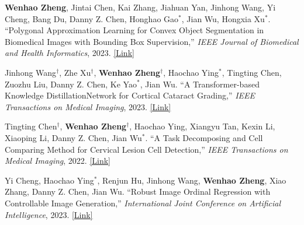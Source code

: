 \begin{cventries}
{\begin{cvitemize2}
            \item \textbf{Wenhao Zheng}, Jintai Chen, Kai Zhang, Jiahuan Yan, Jinhong Wang, Yi Cheng, Bang Du, Danny Z. Chen, Honghao Gao$^*$, Jian Wu, Hongxia Xu$^*$. ``Polygonal Approximation Learning for Convex Object Segmentation in Biomedical Images with Bounding Box Supervision,'' \textit{IEEE Journal of Biomedical and Health Informatics}, 2023. \href{https://ieeexplore.ieee.org/document/10354298}{\textcolor{link}{[Link]}}
            \vspace{1mm}
            \item Jinhong Wang$^\dagger$, Zhe Xu$^\dagger$, \textbf{Wenhao Zheng$^\dagger$}, Haochao Ying$^*$, Tingting Chen, Zuozhu Liu, Danny Z. Chen, Ke Yao$^*$, Jian Wu. ``A Transformer-based Knowledge DistillationNetwork for Cortical Cataract Grading,'' \textit{IEEE Transactions on Medical Imaging}, 2023. \href{https://ieeexplore.ieee.org/abstract/document/10294274}{\textcolor{link}{[Link]}}
            \vspace{1mm}
            \item Tingting Chen$^\dagger$, \textbf{Wenhao Zheng$^\dagger$}, Haochao Ying, Xiangyu Tan, Kexin Li, Xiaoping Li, Danny Z. Chen, Jian Wu$^*$. ``A Task Decomposing and Cell Comparing Method for Cervical Lesion Cell Detection,'' \textit{IEEE Transactions on Medical Imaging}, 2022. \href{https://ieeexplore.ieee.org/document/9744114}{\textcolor{link}{[Link]}}
            \vspace{1mm}
            \item Yi Cheng, Haochao Ying$^*$, Renjun Hu, Jinhong Wang, \textbf{Wenhao Zheng}, Xiao Zhang, Danny Z. Chen, Jian Wu. ``Robust Image Ordinal Regression with Controllable Image Generation,'' \textit{International Joint Conference on Artificial Intelligence}, 2023. \href{https://dl.acm.org/doi/abs/10.24963/ijcai.2023/70}{\textcolor{link}{[Link]}}

\end{cvitemize2}}
\end{cventries}
